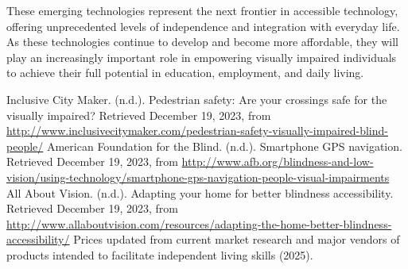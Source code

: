 These emerging technologies represent the next frontier in accessible technology, offering unprecedented levels of independence and integration with everyday life. As these technologies continue to develop and become more affordable, they will play an increasingly important role in empowering visually impaired individuals to achieve their full potential in education, employment, and daily living.
\begin{thebibliography}{99}
 Inclusive City Maker. (n.d.). Pedestrian safety: Are your crossings safe for the visually impaired? Retrieved December 19, 2023, from \url{http://www.inclusivecitymaker.com/pedestrian-safety-visually-impaired-blind-people/}
 American Foundation for the Blind. (n.d.). Smartphone GPS navigation. Retrieved December 19, 2023, from \url{http://www.afb.org/blindness-and-low-vision/using-technology/smartphone-gps-navigation-people-visual-impairments}
 All About Vision. (n.d.). Adapting your home for better blindness accessibility. Retrieved December 19, 2023, from \url{http://www.allaboutvision.com/resources/adapting-the-home-better-blindness-accessibility/}
 Prices updated from current market research and major vendors of products intended to facilitate independent living skills (2025).
\end{thebibliography}
